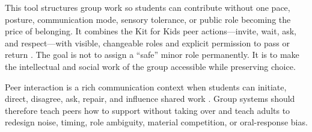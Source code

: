 
\vspace{-0.5cm}

This tool structures group work so students can contribute without one pace, posture, communication mode, sensory tolerance, or public role becoming the price of belonging. It combines the Kit for Kids peer actions---invite, wait, ask, and respect---with visible, changeable roles and explicit permission to pass or return \citep{oar2026kit,oar2026tips}. The goal is not to assign a ``safe'' minor role permanently. It is to make the intellectual and social work of the group accessible while preserving choice.

Peer interaction is a rich communication context when students can initiate, direct, disagree, ask, repair, and influence shared work \citep{downing2015classroom}. Group systems should therefore teach peers how to support without taking over and teach adults to redesign noise, timing, role ambiguity, material competition, or oral-response bias.


